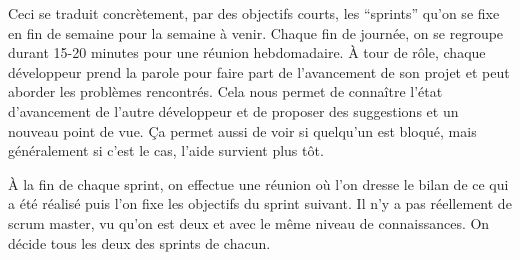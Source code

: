 Ceci se traduit concrètement, par des objectifs courts, les ``sprints'' qu'on se fixe en fin de semaine pour la semaine à venir. Chaque fin de journée, on se regroupe durant 15-20 minutes pour une réunion hebdomadaire. À tour de rôle, chaque développeur prend la parole pour faire part de l’avancement de son projet et peut aborder les problèmes rencontrés.
Cela nous permet de connaître l’état d’avancement de l’autre développeur et de proposer des suggestions et un nouveau point de vue. Ça permet
aussi de voir si quelqu'un est bloqué, mais généralement si c'est le cas, l'aide survient plus tôt.

À la fin de chaque sprint, on effectue une réunion où l'on dresse le  bilan de ce qui a été réalisé puis l'on fixe les objectifs du sprint suivant. 
Il n’y a pas réellement de scrum master, vu qu’on est deux et avec le même niveau de connaissances. On décide tous les deux des sprints de chacun.